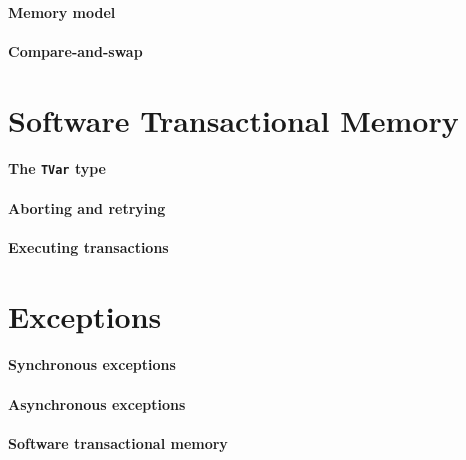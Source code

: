 \paragraph{Memory model}

\paragraph{Compare-and-swap}

\section{Software Transactional Memory}
\label{sec:concurrent_haskell-stm}

\paragraph{The \texttt{TVar} type}

\paragraph{Aborting and retrying}

\paragraph{Executing transactions}

\section{Exceptions}
\label{sec:concurrent_haskell-exc}

\paragraph{Synchronous exceptions}

\paragraph{Asynchronous exceptions}

\paragraph{Software transactional memory}
